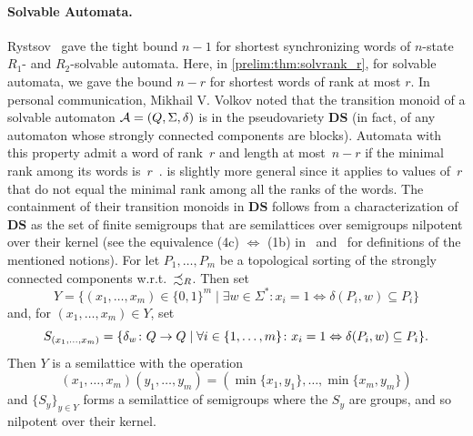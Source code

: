 \paragraph{Solvable Automata.} Rystsov~\cite{Rys96} gave the tight bound $n-1$
for shortest synchronizing words of $n$-state $R_1$- and $R_2$-solvable automata. Here, in \cref{prelim:thm:solvrank_r}, 
for solvable automata, we gave the bound $n - r$
for shortest words of rank at most $r$.
 In personal communication, Mikhail V. Volkov
 noted  that the transition monoid of a solvable automaton $\mathcal A = (Q, \Sigma, \delta)$ 
 is in the pseudovariety $\mathbf{DS}$ (in fact, of any automaton whose strongly connected components are blocks).
 Automata with this property
 admit a word of rank~$r$ and length at most~$n - r$
 if the minimal rank among its words is~$r$~\cite[Thm.~2.6]{AlmeidaS09}.
 is slightly more general since it applies
 to values of~$r$ that do not equal
 the minimal rank among all the ranks of the words.
 The containment of their transition monoids in $\mathbf{DS}$
 follows from a characterization of $\mathbf{DS}$
 as the set of finite semigroups that are semilattices over semigroups
 nilpotent over their kernel (see the equivalence (4c) $\Leftrightarrow$ (1b) in~\cite[Thm.~3]{She95a}
 and~\cite{DBLP:journals/corr/abs-2409-06971,She95a} 
 for definitions of the mentioned notions).
 For let $P_1, \ldots, P_m$
 be a topological sorting of the strongly connected components w.r.t.~$\precsim_R$.
 Then set
 \[
 Y = \{ (x_1, \ldots, x_m) \in \{0,1\}^m \mid \exists w \in \Sigma^* \colon x_i = 1 \Leftrightarrow \delta(P_i,w) \subseteq P_i \}
 \]
 and, for $(x_1, \ldots, x_m) \in Y$, set
 \[
 S_{(x_1, \ldots, x_m)} = \{ {\delta}_{w} \colon Q \to Q \mid \forall i \in \{1,\ldots,m\} \colon x_i = 1 \Leftrightarrow \delta(P_i, w) \subseteq P_i \}.
 \]
 Then $Y$ is a semilattice with the operation
 \[
 (x_1, \ldots, x_m)(y_1, \ldots, y_m) = (\min\{x_1,y_1\},\ldots,\min\{x_m,y_m\})
 \]
 and $\{ S_y \}_{y \in Y}$
 forms a semilattice of semigroups
 where the $S_y$ are groups, and so nilpotent over their kernel.